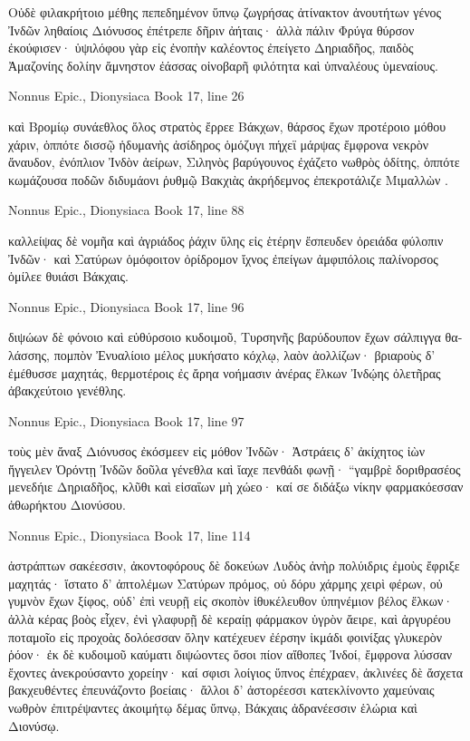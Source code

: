 \documentclass[12pt,letterpaper,twoside,final]{memoir}
\begin{document}
\begin{greek}
Οὐδὲ φιλακρήτοιο μέθης πεπεδημένον ὕπνῳ 
ζωγρήσας ἀτίνακτον ἀνουτήτων γένος Ἰνδῶν 
ληθαίοις Διόνυσος ἐπέτρεπε δῆριν ἀήταις· 
ἀλλὰ πάλιν Φρύγα θύρσον ἐκούφισεν· ὑψιλόφου γὰρ 
εἰς ἐνοπὴν καλέοντος ἐπείγετο Δηριαδῆος, 
παιδὸς Ἀμαζονίης δολίην ἄμνηστον ἐάσσας 
οἰνοβαρῆ φιλότητα καὶ ὑπναλέους ὑμεναίους. 



Nonnus Epic., Dionysiaca 
Book 17, line 26

καὶ Βρομίῳ συνάεθλος ὅλος στρατὸς ἔρρεε Βάκχων, 
θάρσος ἔχων προτέροιο μόθου χάριν, ὁππότε δισσῷ 
ἡδυμανὴς ἀσίδηρος ὁμόζυγι πήχεϊ μάρψας 
ἔμφρονα νεκρὸν ἄναυδον, ἐνόπλιον Ἰνδὸν ἀείρων, 
Σιληνὸς βαρύγουνος ἐχάζετο νωθρὸς ὁδίτης, 
ὁππότε κωμάζουσα ποδῶν διδυμάονι ῥυθμῷ 
Βακχιὰς ἀκρήδεμνος ἐπεκροτάλιζε Μιμαλλὼν . 



Nonnus Epic., Dionysiaca 
Book 17, line 88

καλλείψας δὲ νομῆα καὶ ἀγριάδος ῥάχιν ὕλης 
εἰς ἑτέρην ἔσπευδεν ὀρειάδα φύλοπιν Ἰνδῶν· 
καὶ Σατύρων ὁμόφοιτον ὀρίδρομον ἴχνος ἐπείγων 
ἀμφιπόλοις παλίνορσος ὁμίλεε θυιάσι Βάκχαις. 



Nonnus Epic., Dionysiaca 
Book 17, line 96

διψώων δὲ φόνοιο καὶ εὐθύρσοιο κυδοιμοῦ, 
Τυρσηνῆς βαρύδουπον ἔχων σάλπιγγα θαλάσσης, 
πομπὸν Ἐνυαλίοιο μέλος μυκήσατο κόχλῳ, 
λαὸν ἀολλίζων· βριαροὺς δ' ἐμέθυσσε μαχητάς, 
θερμοτέροις ἐς ἄρηα νοήμασιν ἀνέρας ἕλκων 
Ἰνδῴης ὀλετῆρας ἀβακχεύτοιο γενέθλης. 



Nonnus Epic., Dionysiaca 
Book 17, line 97

τοὺς μὲν ἄναξ Διόνυσος ἐκόσμεεν εἰς μόθον Ἰνδῶν· 
Ἀστράεις δ' ἀκίχητος ἰὼν ἤγγειλεν Ὀρόντῃ 
Ἰνδῶν δοῦλα γένεθλα καὶ ἴαχε πενθάδι φωνῇ· 
 “γαμβρὲ δοριθρασέος μενεδήιε Δηριαδῆος, 
κλῦθι καὶ εἰσαΐων μὴ χώεο· καί σε διδάξω 
νίκην φαρμακόεσσαν ἀθωρήκτου Διονύσου. 



Nonnus Epic., Dionysiaca 
Book 17, line 114

ἀστράπτων σακέεσσιν, ἀκοντοφόρους δὲ δοκεύων 
Λυδὸς ἀνὴρ πολύιδρις ἐμοὺς ἔφριξε μαχητάς· 
ἵστατο δ' ἀπτολέμων Σατύρων πρόμος, οὐ δόρυ χάρμης 
χειρὶ φέρων, οὐ γυμνὸν ἔχων ξίφος, οὐδ' ἐπὶ νευρῇ 
εἰς σκοπὸν ἰθυκέλευθον ὑπηνέμιον βέλος ἕλκων· 
ἀλλὰ κέρας βοὸς εἶχεν, ἐνὶ γλαφυρῇ δὲ κεραίῃ 
φάρμακον ὑγρὸν ἄειρε, καὶ ἀργυρέου ποταμοῖο 
εἰς προχοὰς δολόεσσαν ὅλην κατέχευεν ἐέρσην 
ἰκμάδι φοινίξας γλυκερὸν ῥόον· ἐκ δὲ κυδοιμοῦ 
καύματι διψώοντες ὅσοι πίον αἴθοπες Ἰνδοί, 
ἔμφρονα λύσσαν ἔχοντες ἀνεκρούσαντο χορείην· 
καί σφισι λοίγιος ὕπνος ἐπέχραεν, ἀκλινέες δὲ 
ἄσχετα βακχευθέντες ἐπευνάζοντο βοείαις·   
ἄλλοι δ' ἀστορέεσσι κατεκλίνοντο χαμεύναις 
νωθρὸν ἐπιτρέψαντες ἀκοιμήτῳ δέμας ὕπνῳ, 
Βάκχαις ἀδρανέεσσιν ἑλώρια καὶ Διονύσῳ. 




\end{greek}
\end{document}
